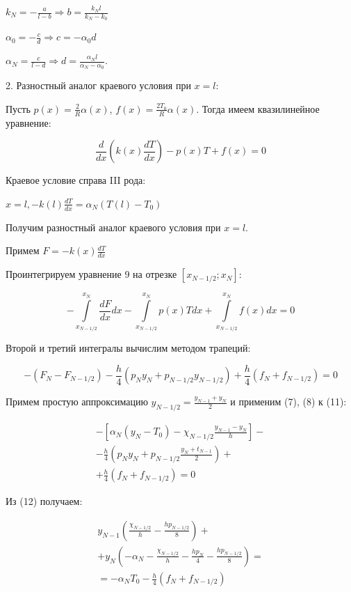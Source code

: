 \documentclass[a4paper,14pt]{article}
\begin{document}
$k_N = - \frac{a}{l - b} \Rightarrow b = \frac{k_N l}{k_N - k_0}$

$\alpha_0 = - \frac{c}{d} \Rightarrow c = - \alpha_0d$

$\alpha_N = \frac{c}{l - d} \Rightarrow d = \frac{\alpha_N l}{\alpha_N - \alpha_0}$.

2. Разностный аналог краевого условия при $x = l$:

Пусть $p(x) = \frac{2}{R}\alpha(x)$, $f(x) = \frac{2T_0}{R}\alpha(x)$.
Тогда имеем квазилинейное уравнение:

\begin{equation}
	\frac{d}{dx} \left( k(x) \frac{dT}{dx} \right) - p(x) T + f(x) = 0
\end{equation}

Краевое условие справа III рода:

$x = l, -k(l)\frac{dT}{dx} = \alpha_N(T(l) - T_0)$

Получим разностный аналог краевого условия при $x = l$.

Примем $F = -k(x)\frac{dT}{dx}$

Проинтегрируем уравнение 9 на отрезке $[x_{N-1/2}; x_N]$:

\begin{equation}
	-\int\limits_{x_{N-1/2}}^{x_N} \frac{dF}{dx} dx -
	\int\limits_{x_{N-1/2}}^{x_N} p(x)T dx + 
	\int\limits_{x_{N-1/2}}^{x_N} f(x) dx = 0
\end{equation}

Второй и третий интегралы вычислим методом трапеций:

\begin{equation}
	-(F_N - F_{N - 1/2}) -\frac{h}{4}(p_N y_N + p_{N-1/2}y_{N-1/2})
	+ \frac{h}{4}(f_N + f_{N-1/2}) = 0
\end{equation}

Примем простую аппроксимацию $y_{N-1/2} = \frac{y_{N-1} + y_N}{2}$ 
и применим (7), (8) к (11):

\begin{eqnarray}
	-\left[ \alpha_N(y_N - T_0) - \chi_{N-1/2}\frac{y_{N-1} - y_N}{h} \right] - \nonumber \\
	- \frac{h}{4} \left( p_N y_N + p_{N-1/2}\frac{y_N + t_{N-1}}{2} \right) + \nonumber \\
	+ \frac{h}{4} \left( f_N + f_{N-1/2} \right) = 0
\end{eqnarray}

Из (12) получаем:

\begin{eqnarray}
	y_{N-1} \left( \frac{\chi_{N-1/2}}{h}  - \frac{hp_{N-1/2}}{8} \right) + \nonumber \\
	+ y_N \left( -\alpha_N - \frac{\chi_{N-1/2}}{h} - \frac{hp_N}{4} - \frac{hp_{N-1/2}}{8} \right) = \nonumber \\
	= -\alpha_N T_0 - \frac{h}{4} \left( f_N + f_{N-1/2} \right)
\end{eqnarray}
\end{document}

